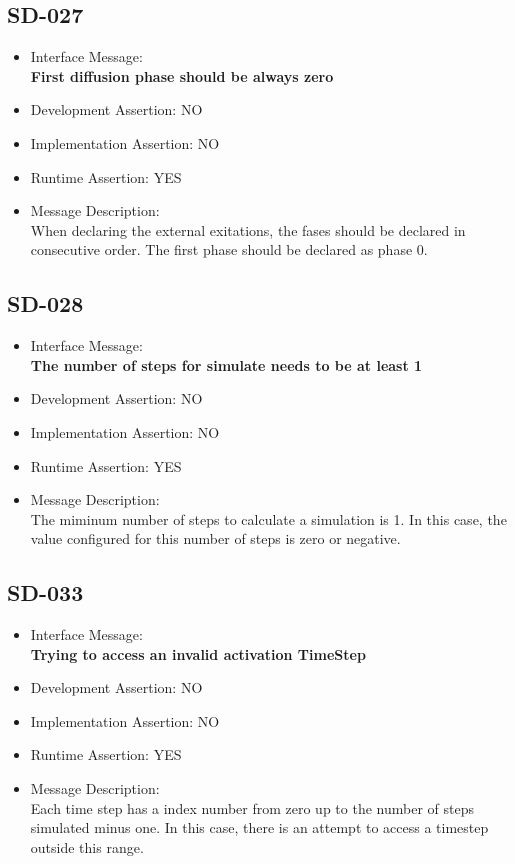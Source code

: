 \subsection{SD-027}
\begin{itemize}
  \item Interface Message:\\[1em]
    \textbf{First diffusion phase should be always zero}
  \item Development Assertion: NO
  \item Implementation Assertion: NO
  \item Runtime Assertion: YES
  \item Message Description:\\[1em]
    When declaring the external exitations, the fases should be declared in consecutive order. The first phase should be declared as phase 0.
\end{itemize}

\subsection{SD-028}
\begin{itemize}
  \item Interface Message:\\[1em]
    \textbf{The number of steps for simulate needs to be at least 1}
  \item Development Assertion: NO
  \item Implementation Assertion: NO
  \item Runtime Assertion: YES
  \item Message Description:\\[1em]
    The miminum number of steps to calculate a simulation is 1. In this case, the value configured for this number of steps is zero or negative.
\end{itemize}

\subsection{SD-033}
\begin{itemize}
  \item Interface Message:\\[1em]
    \textbf{Trying to access an invalid activation TimeStep}
  \item Development Assertion: NO
  \item Implementation Assertion: NO
  \item Runtime Assertion: YES
  \item Message Description:\\[1em]
    Each time step has a index number from zero up to the number of steps simulated minus one. In this case, there is an attempt to access a timestep outside this range.
\end{itemize}

